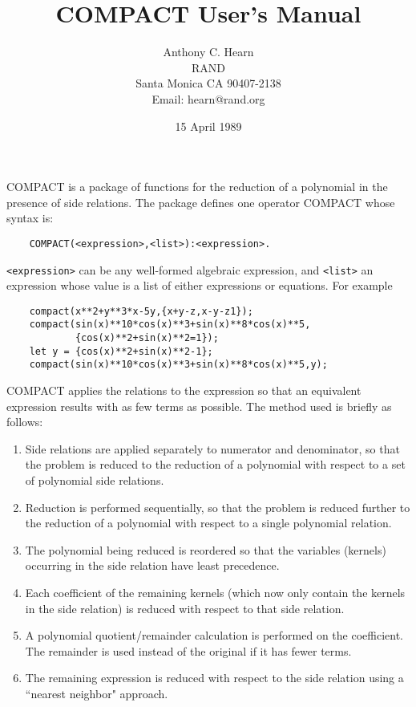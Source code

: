
\title{{COMPACT} User's Manual}
\author{Anthony C. Hearn\\
RAND\\
Santa Monica CA 90407-2138\\[0.05in]
Email: hearn@rand.org}
\date{15 April 1989}
\maketitle
{COMPACT} is a package of functions for the reduction of a polynomial in
the presence of side relations.  The package defines one operator {COMPACT}
whose syntax is:
\begin{verbatim}
    COMPACT(<expression>,<list>):<expression>.
\end{verbatim}
{\tt <expression>} can be any well-formed algebraic expression, and
{\tt <list>} an expression whose value is a list
of either expressions or equations.  For example
\begin{verbatim}
    compact(x**2+y**3*x-5y,{x+y-z,x-y-z1});
    compact(sin(x)**10*cos(x)**3+sin(x)**8*cos(x)**5,
            {cos(x)**2+sin(x)**2=1});
    let y = {cos(x)**2+sin(x)**2-1};
    compact(sin(x)**10*cos(x)**3+sin(x)**8*cos(x)**5,y);
\end{verbatim}
{COMPACT} applies the relations to the expression so that an equivalent
expression results with as few terms as possible.  The method used is
briefly as follows:
\begin{enumerate}
\item Side relations are applied separately to numerator and denominator, so
that the problem is reduced to the reduction of a polynomial with respect to
a set of polynomial side relations.

\item Reduction is performed sequentially, so that the problem is reduced
further to the reduction of a polynomial with respect to a single
polynomial relation.

\item The polynomial being reduced is reordered so that the variables
(kernels) occurring in the side relation have least precedence.

\item Each coefficient of the remaining kernels (which now only contain
the kernels
in the side relation) is reduced with respect to that side relation.

\item A polynomial quotient/remainder calculation is performed on the
coefficient.  The remainder is
used instead of the original if it has fewer terms.

\item The remaining expression is reduced with respect to the side relation
using a ``nearest neighbor" approach.
\end{enumerate}

